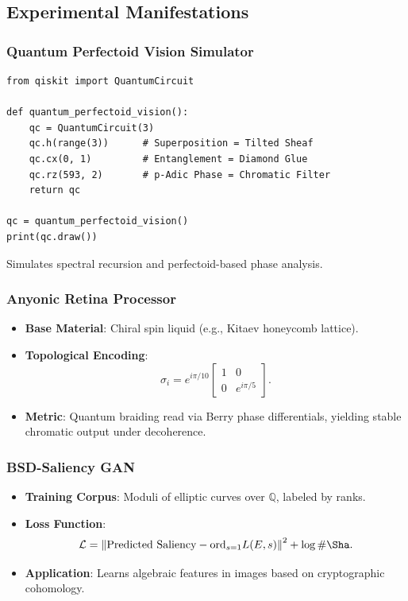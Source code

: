 \documentclass[12pt]{article}
\begin{document}
\subsection{Experimental Manifestations}

\subsubsection{Quantum Perfectoid Vision Simulator}
\begin{verbatim}
from qiskit import QuantumCircuit

def quantum_perfectoid_vision():
    qc = QuantumCircuit(3)
    qc.h(range(3))      # Superposition = Tilted Sheaf
    qc.cx(0, 1)         # Entanglement = Diamond Glue
    qc.rz(593, 2)       # p-Adic Phase = Chromatic Filter
    return qc

qc = quantum_perfectoid_vision()
print(qc.draw())
\end{verbatim}
\begin{interpretation}
Simulates spectral recursion and perfectoid-based phase analysis.
\end{interpretation}

\subsubsection{Anyonic Retina Processor}
\begin{itemize}
    \item \textbf{Base Material}: Chiral spin liquid (e.g., Kitaev honeycomb lattice).
    \item \textbf{Topological Encoding}:
    \[
    \sigma_i = e^{i \pi/10} \begin{bmatrix} 1 & 0 \\ 0 & e^{i\pi/5} \end{bmatrix}.
    \]
    \item \textbf{Metric}: Quantum braiding read via Berry phase differentials, yielding stable chromatic output under decoherence.
\end{itemize}

\subsubsection{BSD-Saliency GAN}
\begin{itemize}
    \item \textbf{Training Corpus}: Moduli of elliptic curves over \( \mathbb{Q} \), labeled by ranks.
    \item \textbf{Loss Function}:
    \[
    \mathcal{L} = \left\| \text{Predicted Saliency} - \mathrm{ord}_{s=1} L(E, s) \right\|^2 + \log \#\Sha.
    \]
    \item \textbf{Application}: Learns algebraic features in images based on cryptographic cohomology.
\end{itemize}
\end{document}
